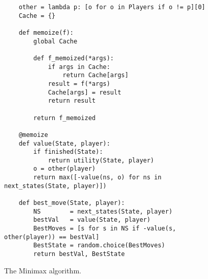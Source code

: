 \begin{figure}[!ht]
\centering
\begin{verbatim}
    other = lambda p: [o for o in Players if o != p][0]
    Cache = {}

    def memoize(f):
        global Cache

        def f_memoized(*args):
            if args in Cache:
                return Cache[args]
            result = f(*args)
            Cache[args] = result
            return result

        return f_memoized
  
    @memoize    
    def value(State, player):
        if finished(State):
            return utility(State, player)
        o = other(player)
        return max([-value(ns, o) for ns in next_states(State, player)])
    
    def best_move(State, player):
        NS        = next_states(State, player)
        bestVal   = value(State, player)
        BestMoves = [s for s in NS if -value(s, other(player)) == bestVal]
        BestState = random.choice(BestMoves)
        return bestVal, BestState
\end{verbatim}
\caption{The Minimax algorithm.}
\label{fig:Minimax.ipynb}
\end{figure}
\FloatBarrier

